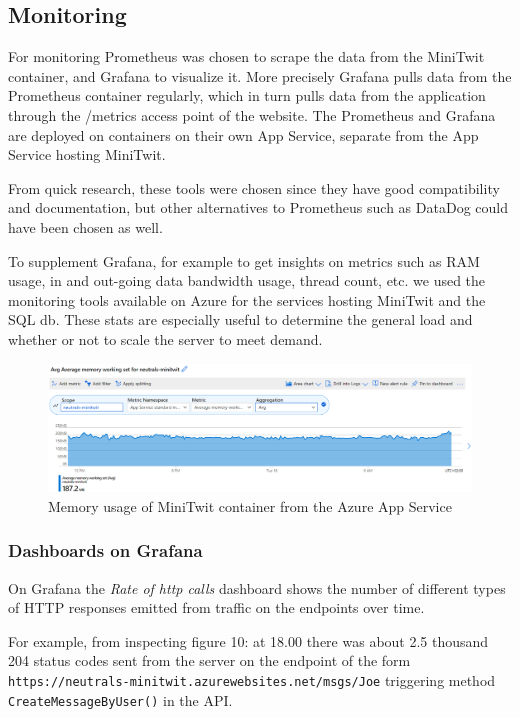 \documentclass{article}
\begin{document}
\subsection{Monitoring}
For monitoring Prometheus was chosen to scrape the data from the MiniTwit container, and Grafana to visualize it. More precisely Grafana pulls data from the Prometheus container regularly, which in turn pulls data from the application through the /metrics access point of the website. The Prometheus and Grafana are deployed on containers on their own App Service, separate from the App Service hosting MiniTwit.

From quick research, these tools were chosen since they have good compatibility and documentation, but other alternatives to Prometheus such as DataDog could have been chosen as well.

To supplement Grafana, for example to get insights on metrics such as RAM usage, in and out-going data bandwidth usage, thread count, etc. we used the monitoring tools available on Azure for the services hosting MiniTwit and the SQL db. These stats are especially useful to determine the general load and whether or not to scale the server to meet demand.  
\begin{figure}[H]
\centering
\includegraphics[width=1\textwidth]{images/azure-mem-usage.png}
\caption{\label{fig:RAM} Memory usage of MiniTwit container from the Azure App Service}
\end{figure}

\subsubsection{Dashboards on Grafana}
On Grafana the \textit{Rate of http calls} dashboard shows the number of different types of HTTP responses emitted from traffic on the endpoints over time. 

For example, from inspecting figure 10: at 18.00 there was about 2.5 thousand 204 status codes sent from the server on the endpoint of the form \texttt{https://neutrals-minitwit.azurewebsites.net/msgs/Joe}
triggering method \texttt{CreateMessageByUser()} in the API.     
\end{document}
